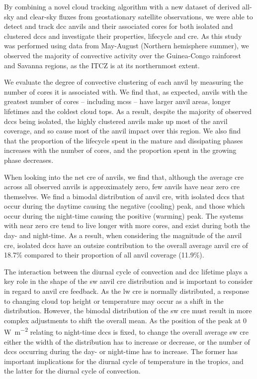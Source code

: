 By combining a novel cloud tracking algorithm with a new dataset of
derived all-sky and clear-sky fluxes from geostationary satellite
observations, we were able to detect and track \acrshort{dcc} anvils and their
associated cores for both isolated and clustered \acrshort{dcc}s and investigate
their properties, lifecycle and \acrshort{cre}. As this study was performed using
data from May-August (Northern hemisphere summer), we observed the
majority of convective activity over the Guinea-Congo rainforest and
Savanna regions, as the ITCZ is at its northernmost extent.

We evaluate the degree of convective clustering of each anvil by
measuring the number of cores it is associated with. We find that, as
expected, anvils with the greatest number of cores -- including \acrshort{mcs}s --
have larger anvil areas, longer lifetimes and the coldest cloud tops. As
a result, despite the majority of observed \acrshort{dcc}s being isolated, the
highly clustered anvils make up most of the anvil coverage, and so cause
most of the anvil impact over this region. We also find that the
proportion of the lifecycle spent in the mature and dissipating phases
increases with the number of cores, and the proportion spent in the
growing phase decreases.

When looking into the net \acrshort{cre} of anvils, we find that, although the
average \acrshort{cre} across all observed anvils is approximately zero, few anvils
have near zero \acrshort{cre} themselves. We find a bimodal distribution of anvil
\acrshort{cre}, with isolated \acrshort{dcc}s that occur during the daytime causing the
negative (cooling) peak, and those which occur during the night-time
causing the positive (warming) peak. The systems with near zero \acrshort{cre} tend
to live longer with more cores, and exist during both the day- and
night-time. As a result, when considering the magnitude of the anvil
\acrshort{cre}, isolated \acrshort{dcc}s have an outsize contribution to the overall average
anvil \acrshort{cre} of 18.7\% compared to their proportion of all anvil coverage
(11.9\%).

The interaction between the diurnal cycle of convection and \acrshort{dcc} lifetime
plays a key role in the shape of the \acrshort{sw} anvil \acrshort{cre} distribution and is
important to consider in regard to anvil \acrshort{cre} feedback. As the \acrshort{lw} \acrshort{cre} is
normally distributed, a response to changing cloud top height or
temperature may occur as a shift in the distribution. However, the
bimodal distribution of the \acrshort{sw} \acrshort{cre} must result in more complex
adjustments to shift the overall mean. As the position of the peak at 0
\,\unit{W m^{-2}} relating to night-time \acrshort{dcc}s is fixed, to change
the overall average \acrshort{sw} \acrshort{cre} either the width of the distribution has to
increase or decrease, or the number of \acrshort{dcc}s occurring during the day- or
night-time has to increase. The former has important implications for
the diurnal cycle of temperature in the tropics, and the latter for the
diurnal cycle of convection.

